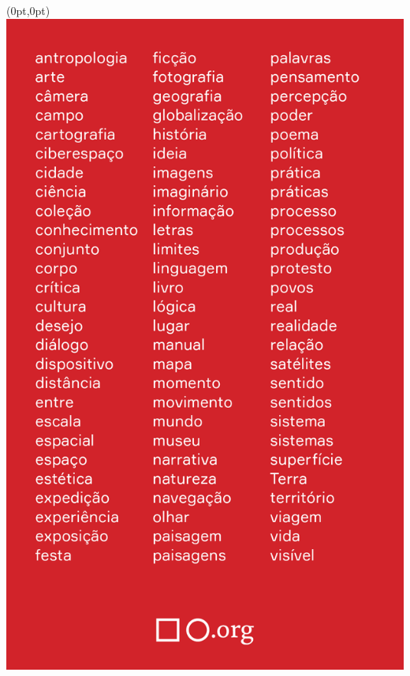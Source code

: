 \pagestyle{quadrado}
\label{quadrado}

\begin{textblock*}{5.625in}(0pt,0pt)%
\vspace*{-2.5cm}
\hspace*{-1.95cm}\includegraphics*[width=147mm]{./imgs/QUADRADO.png}
\end{textblock*}

\pagebreak

\hspace{.5cm}

